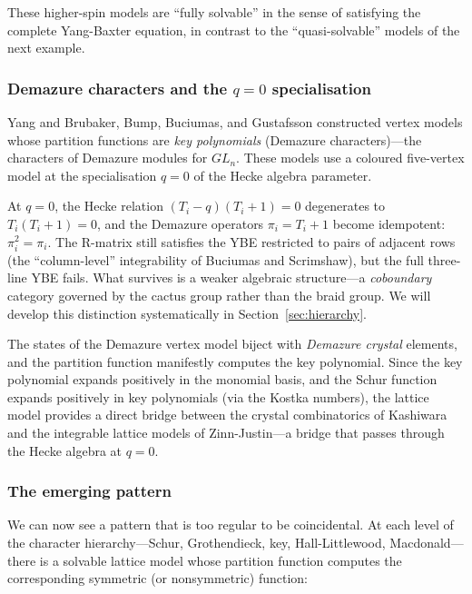 These higher-spin models are ``fully solvable'' in the sense of
satisfying the complete Yang-Baxter equation, in contrast to the
``quasi-solvable'' models of the next example.

\subsubsection*{Demazure characters and the $q=0$ specialisation}

Yang \cite{yang-2025} and Brubaker, Bump, Buciumas, and Gustafsson
\cite{brubaker-bump-buciumas-gustafsson-2021} constructed vertex
models whose partition functions are \emph{key polynomials}
(Demazure characters)---the characters of Demazure modules for
$GL_n$.  These models use a coloured five-vertex model at the
specialisation $q = 0$ of the Hecke algebra parameter.

At $q = 0$, the Hecke relation $(T_i - q)(T_i + 1) = 0$ degenerates
to $T_i(T_i + 1) = 0$, and the Demazure operators $\pi_i = T_i + 1$
become idempotent: $\pi_i^2 = \pi_i$.  The R-matrix still satisfies
the YBE restricted to pairs of adjacent rows (the ``column-level''
integrability of Buciumas and Scrimshaw), but the full three-line YBE
fails.  What survives is a weaker algebraic structure---a
\emph{coboundary} category governed by the cactus group rather than
the braid group.  We will develop this distinction systematically in
Section~\ref{sec:hierarchy}.

The states of the Demazure vertex model biject with
\emph{Demazure crystal} elements, and the partition function
manifestly computes the key polynomial.  Since the key polynomial
expands positively in the monomial basis, and the Schur function
expands positively in key polynomials (via the Kostka numbers), the
lattice model provides a direct bridge between the crystal
combinatorics of Kashiwara \cite{kashiwara-1990} and the integrable
lattice models of Zinn-Justin---a bridge that passes through the
Hecke algebra at $q = 0$.

\subsubsection*{The emerging pattern}

We can now see a pattern that is too regular to be coincidental.  At
each level of the character hierarchy---Schur, Grothendieck, key,
Hall-Littlewood, Macdonald---there is a solvable lattice model whose
partition function computes the corresponding symmetric (or
nonsymmetric) function:

